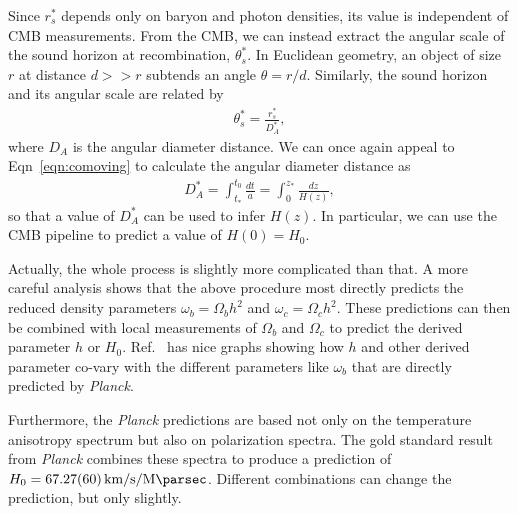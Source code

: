 \documentclass[12pt]{article}
\newcommand{\units}{\kilo\meter\per\second\per\mega\parsec}
\newcommand{\hnaught}[1]{\SI{#1}{\units}}
\newcommand{\Planck}[1]{\textit{Planck}}
\begin{document}
Since $r^*_s$ depends only on baryon and photon densities, its value is independent of CMB measurements. From the CMB, we can instead extract the angular scale of the sound horizon at recombination, $\theta_s^*$. 
In Euclidean geometry, an object of size $r$ at distance $d>>r$ subtends an angle $\theta = r/d$.
Similarly, the sound horizon and its angular scale are related by
\begin{align}
\theta_s^* = \frac{r_s^*}{D_A^*},
\end{align}
where $D_A$ is the angular diameter distance.
We can once again appeal to Eqn~\ref{eqn:comoving} to calculate the angular diameter distance as~\cite{Samtleben2007, DiValentino2021}
\begin{align}
D_A^* = \int_{t_*}^{t_0}\frac{dt}{a} =  \int_0^{z_*}\frac{dz}{H(z)}, \label{eqn:distance}
\end{align}
so that a value of $D_A^*$ can be used to infer $H(z)$. In particular, we can use the CMB pipeline to predict a value of $H(0) = H_0$.

Actually, the whole process is slightly more complicated than that. A more careful analysis shows that the above procedure most directly predicts the reduced density parameters $\omega_b = \Omega_bh^2$ and $\omega_c = \Omega_c h^2$. These predictions can then be combined with local measurements of $\Omega_b$ and $\Omega_c$ to predict the derived parameter $h$ or $H_0$. Ref.~\cite{Planck2018} has nice graphs showing how $h$ and other derived parameter co-vary with the different parameters like $\omega_b$ that are directly predicted by \textit{Planck}. 

Furthermore, the \Planck{} predictions are based not only on the temperature anisotropy spectrum but also on polarization spectra. The gold standard result from \Planck{} combines these spectra to produce a prediction of ${H_0 = \hnaught{67.27 \pm 0.6}}$. Different combinations can change the prediction, but only slightly.
\end{document}
